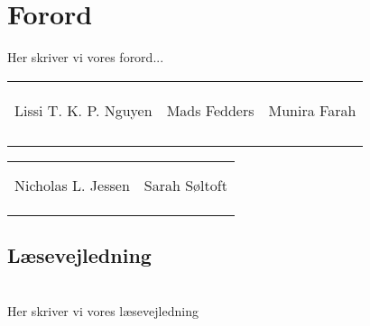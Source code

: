 \chapter*{Forord}
Her skriver vi vores forord...


\phantom{Luft}
\phantom{Luft}
\phantom{Luft}
\phantom{Luft}
\phantom{Luft}
\phantom{Luft}

\begin{table}[H]
	\centering
		\begin{tabular}{c c c}
		&&\\
			\underline{\phantom{mmmmmmmmmmmmmm}} & \underline{\phantom{mmmmmmmmmmmmmm}} & \underline{\phantom{mmmmmmmmmmmmmm}} \\ \\
			Lissi T. K. P. Nguyen			& Mads Fedders 		& Munira Farah 			\\
			&&\\
			&&\\
			&&\\
			&&\\
			
		 																				
																					
		\end{tabular}
		\begin{tabular}{c c}
		     &  \\
		     \underline{\phantom{mmmmmmmmmmmmmm}} & \underline{\phantom{mmmmmmmmmmmmmm}} & \\
			Nicholas L. Jessen			& Sarah Søltoft			\\
			&&\\
			&&\\
		     & 
		\end{tabular}
\end{table}

\newpage


\section*{Læsevejledning} \\ 
Her skriver vi vores læsevejledning